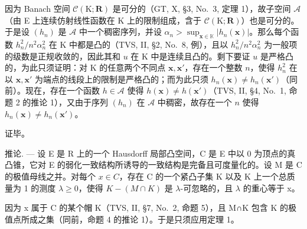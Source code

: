 因为 Banach 空间 \(\mathcal{C}(\mathrm{K};\mathbf{R})\) 是可分的（GT, X, §3, No.~3, 定理 1），故子空间 \(\mathcal{A}\)（由 E 上连续仿射线性函数在 K 上的限制组成，含于 \(\mathcal{C}(\mathrm{K};\mathbf{R})\)）也是可分的。于是设 \((h_n)\) 是 \(\mathcal{A}\) 中一个稠密序列，并设 \(\alpha_{n} > \sup_{\mathbf{x}\in \mathbb{K}}|h_n(\mathbf{x})|\)。那么每个函数 \(h_n^2 / n^2\alpha_n^2\) 在 K 中都是凸的（TVS, II, §2, No.~8, 例），且以 \(h_n^2 / n^2\alpha_n^2\) 为一般项的级数是正规收敛的，因此其和 \(u\) 在 K 中是连续且凸的。剩下要证 \(u\) 是严格凸的，为此只须证明：对 K 的任意两个不同点 \(\mathbf{x},\mathbf{x}'\)，存在一个整数 \(n\)，使得 \(h_n^2\) 在以 \(\mathbf{x},\mathbf{x}'\) 为端点的线段上的限制是严格凸的；而为此只须 \(h_n(\mathbf{x})\neq h_n(\mathbf{x}')\)（同前）。现在，存在一个函数 \(h\in \mathcal{A}\) 使得 \(h(\mathbf{x})\neq h(\mathbf{x}')\)（TVS, II, §4, No.~1, 命题 2 的推论 1），又由于序列 \((h_n)\) 在 \(\mathcal{A}\) 中稠密，故存在一个 \(n\) 使得 \(h_n(\mathbf{x})\neq h_n(\mathbf{x}')\)。

证毕。

推论. --- 设 E 是 R 上的一个 Hausdorff 局部凸空间，C 是 E 中以 0 为顶点的真凸锥，它对 E 的弱化一致结构所诱导的一致结构是完备且可度量化的。设 M 是 C 的极值母线之并。对每个 \(x \in C\)，存在 C 的一个紧凸子集 K 以及 K 上一个总质量为 1 的测度 \(\lambda \geqslant 0\)，使得 \(K - (M \cap K)\) 是 \(\lambda\)-可忽略的，且 \(\lambda\) 的重心等于 x。

因为 x 属于 C 的某个帽 K（TVS, II, §7, No.~2, 命题 5），且 M∩K 包含 K 的极值点所成之集（同前，命题 4 的推论 1）。于是只须应用定理 1。

